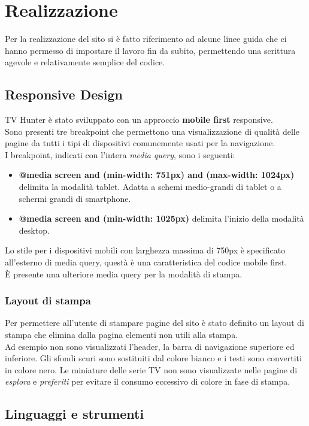 \section{Realizzazione}
Per la realizzazione del sito si è fatto riferimento ad alcune linee guida che ci hanno permesso di impostare il lavoro fin da subito, permettendo una scrittura agevole e relativamente semplice del codice.

\subsection{Responsive Design}
TV Hunter è stato sviluppato con un approccio \textbf{mobile first} responsive.\\
Sono presenti tre breakpoint che permettono una visualizzazione di qualità delle pagine da tutti i tipi di dispositivi comunemente usati per la navigazione.\\
I breakpoint, indicati con l'intera \textit{media query}, sono i seguenti:
\begin{itemize}
	\item \textbf{@media screen and (min-width: 751px) and (max-width: 1024px)} delimita la modalità tablet. Adatta a schemi medio-grandi di tablet o a schermi grandi di smartphone.
	\item \textbf{@media screen and (min-width: 1025px)} delimita l'inizio della modalità desktop. 
\end{itemize}
Lo stile per i dispositivi mobili con larghezza massima di 750px è specificato all'esterno di media query, questà è una caratteristica del codice mobile first.\\
È presente una ulteriore media query per la modalità di stampa.
\subsubsection{Layout di stampa}
Per permettere all'utente di stampare pagine del sito è stato definito un layout di stampa che elimina dalla pagina elementi non utili alla stampa.\\
Ad esempio non sono visualizzati l'header, la barra di navigazione superiore ed inferiore. Gli sfondi scuri sono sostituiti dal colore bianco e i testi sono convertiti in colore nero. Le miniature delle serie TV non sono visualizzate nelle pagine di \textit{esplora} e \textit{preferiti} per evitare il consumo eccessivo di colore in fase di stampa.

\subsection{Linguaggi e strumenti}

